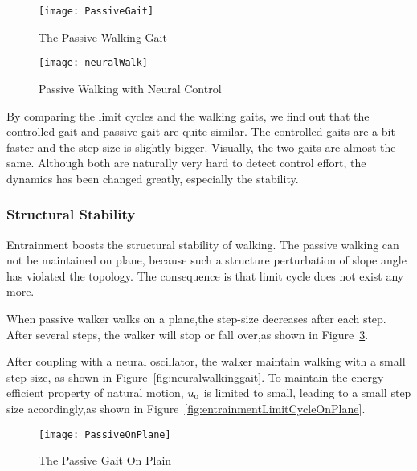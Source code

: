\begin{figure}[!htbp]
  \begin{center}
     \texttt{[image: PassiveGait]}
    \caption{The Passive Walking Gait}
    \label{fig:passivegait}
\end{center}
\end{figure}

\begin{figure}[!htbp]
  \begin{center}
     \texttt{[image: neuralWalk]}
    \caption{Passive Walking with Neural Control}
    \label{fig:entrainmentgait}
\end{center}
\end{figure}

By comparing the limit cycles and the walking gaits, we find out that the controlled gait and passive gait are quite similar.
The controlled gaits are a bit faster and the step size is  slightly bigger.
Visually, the two gaits are almost the same.
Although both are naturally very hard to detect control effort, the dynamics has been changed greatly, especially the stability.



\subsubsection*{Structural Stability}
Entrainment boosts the structural stability of walking. 
The passive walking can not be maintained on plane, because such a structure perturbation of slope angle has violated the topology.
The consequence is that limit cycle does not exist any more.


When passive walker walks on a plane,the step-size decreases after each step.
After several steps, the walker will stop or fall over,as shown in Figure~\ref{fig:passivegaitplane}.

After coupling with a neural oscillator, the  walker maintain walking with a small step size, as shown in Figure~\ref{fig:neuralwalkinggait}.
To maintain the energy efficient property of natural motion, $u_{\mathrm{o}}$ is limited to small, leading to a small step size accordingly,as shown in Figure~\ref{fig:entrainmentLimitCycleOnPlane}.

\begin{figure}[!htbp]
  \begin{center}
    \texttt{[image: PassiveOnPlane]}
    \caption{The Passive Gait On Plain}
    \label{fig:passivegaitplane}
\end{center}
\end{figure}


